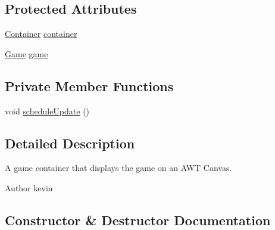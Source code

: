 \subsection*{Protected Attributes}
\begin{DoxyCompactItemize}
\item 
\mbox{\hyperlink{classorg_1_1newdawn_1_1slick_1_1_canvas_game_container_1_1_container}{Container}} \mbox{\hyperlink{classorg_1_1newdawn_1_1slick_1_1_canvas_game_container_af13c765d7302dc5948d0261e2526ef8b}{container}}
\item 
\mbox{\hyperlink{interfaceorg_1_1newdawn_1_1slick_1_1_game}{Game}} \mbox{\hyperlink{classorg_1_1newdawn_1_1slick_1_1_canvas_game_container_aea0c3147fede8b9e57819fbee5c50612}{game}}
\end{DoxyCompactItemize}
\subsection*{Private Member Functions}
\begin{DoxyCompactItemize}
\item 
void \mbox{\hyperlink{classorg_1_1newdawn_1_1slick_1_1_canvas_game_container_a38f91f490299ca036d075779ff15ff15}{schedule\+Update}} ()
\end{DoxyCompactItemize}


\subsection{Detailed Description}
A game container that displays the game on an A\+WT Canvas.

\begin{DoxyAuthor}{Author}
kevin 
\end{DoxyAuthor}


\subsection{Constructor \& Destructor Documentation}
\mbox{\label{classorg_1_1newdawn_1_1slick_1_1_canvas_game_container_a078feee2c69d77cabd1f09b87d055923}} 
